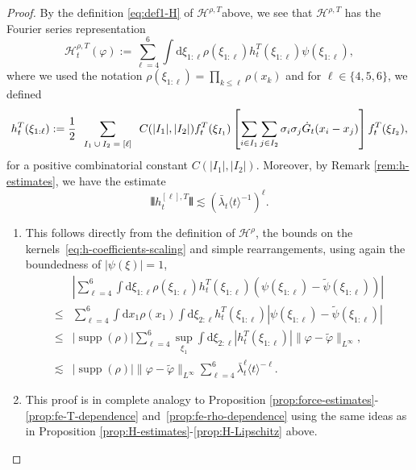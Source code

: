 \documentclass[11pt, a4paper]{scrartcl}
\numberwithin{equation}{section}
\theoremstyle{plain}
\theoremstyle{remark}
\newcommand{\assign}{:=}
\newcommand{\mathd}{\mathrm{d}}
\newcommand{\tmop}[1]{\ensuremath{\operatorname{#1}}}
\newcommand{\tmscript}[1]{\text{\scriptsize{$#1$}}}
\newenvironment{enumeratealpha}{\begin{enumerate}[a{\textup{)}}] }{\end{enumerate}}
\begin{document}
\begin{proof}
	By the definition \eqref{eq:def1-H} of $\mathcal{H}^{\rho, T}$above, we see
	that $\mathcal{H}^{\rho, T}$ has the Fourier series representation
	\begin{equation}
		\mathcal{H}_t^{\rho, T} (\varphi) \assign \sum_{\ell = 4}^6 \int \mathd
		\xi_{1 : \ell} \rho (\xi_{1 : \ell}) h^T_t (\xi_{1 : \ell}) \psi (\xi_{1 :
			\ell}), \label{eq:def-pot-remainder}
	\end{equation}
	where we used the notation $\rho (\xi_{1 : \ell}) = \prod_{k \leqslant \ell}
		\rho (x_k)$ and for $\ell \in \{ 4, 5, 6 \}$, we defined
	\begin{equation}
		h^T_t (\xi_{1 : \ell}) \assign \frac{1}{2}
		\sum_{\tmscript{\begin{array}{c}
					I_1 \cup I_2 = [\ell]
				\end{array}}} C (| I_1 |, | I_2 |) f_t^T (\xi_{I_1}) \left[ \sum_{i \in
				I_1} \sum_{j \in I_2} \sigma_i \sigma_j  \dot{G}_t (x_i - x_j) \right]
		f_t^T (\xi_{I_2}), \label{eq:def-h-coefficients}
	\end{equation}
	for a positive combinatorial constant $C (| I_1 |, | I_2 |)$. Moreover, by
	Remark \ref{rem:h-estimates}, we have the estimate
	\begin{equation}
		\interleave h^{[\ell], T}_t \interleave \lesssim (\bar{\lambda}_t \langle t
		\rangle^{- 1})^{\ell} . \label{eq:h-coefficients-scaling}
	\end{equation}
	\begin{enumeratealpha}
		\item This follows directly from the definition of $\mathcal{H}^{\rho}$,
		the bounds on the kernels~\eqref{eq:h-coefficients-scaling} and simple
		rearrangements, using again the boundedness of $| \psi (\xi) | = 1$,
		\[ \begin{aligned}
				          & \left| \sum_{\ell = 4}^6 \int \mathd \xi_{1 : \ell} \rho (\xi_{1 :
					\ell}) h^T_t (\xi_{1 : \ell}) (\psi (\xi_{1 : \ell}) - \tilde{\psi}
				(\xi_{1 : \ell})) \right|                                                      \\
				\leqslant & \sum_{\ell = 4}^6 \int \mathd x_1 \rho (x_1)  \int \mathd
				\xi_{2 : \ell} h^T_t (\xi_{1 : \ell}) | \psi (\xi_{1 : \ell}) -
				\tilde{\psi} (\xi_{1 : \ell}) |                                                \\
				\leqslant & | \tmop{supp} (\rho) |  \sum_{\ell = 4}^6 \sup_{\xi_1}
				\int \mathd \xi_{2 : \ell} | h^T_t (\xi_{1 : \ell}) |  \| \varphi -
				\tilde{\varphi} \|_{L^{\infty}},                                               \\
				\lesssim  & | \tmop{supp} (\rho) |  \| \varphi - \tilde{\varphi}
				\|_{L^{\infty}}  \sum_{\ell = 4}^6 \bar{\lambda}_t^{\ell} \langle t
				\rangle^{- \ell} .
			\end{aligned} \]
		\item This proof is in complete analogy to Proposition
		\ref{prop:force-estimates}-\ref{prop:fe-T-dependence}
		and~\ref{prop:fe-rho-dependence} using the same ideas as in Proposition
		\ref{prop:H-estimates}-\ref{prop:H-Lipschitz} above.
	\end{enumeratealpha}
\end{proof}
\end{document}
